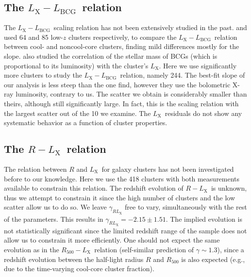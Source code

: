 \documentclass{aa}   %
\newcommand{\LxLbcg}{$L_{\text{X}}-L_{\text{BCG}}$}
\newcommand{\RL}{$R-L_{\text{X}}$}
\newcommand{\Lx}{$L_{\text{X}}$}
\begin{document}
\subsection{The \LxLbcg\ relation}

The \LxLbcg\ scaling relation has not been extensively studied in the past. \citet{mittal2} and \citet{bharad14} used 64 and 85 low-$z$ clusters respectively, to compare the \LxLbcg\ relation between cool- and noncool-core clusters, finding mild differences mostly for the slope. \citet{furnell} also studied the correlation of the stellar mass of BCGs (which is proportional to its luminosity) with the cluster's \Lx. Here we use significantly more clusters to study the \LxLbcg\ relation, namely 244. The best-fit slope of our analysis is less steep than the one \citet{bharad14} find, however they use the bolometric X-ray luminosity, contrary to us. The scatter we obtain is considerably smaller than theirs, although still significantly large. In fact, this is the scaling relation with the largest scatter out of the 10 we examine. The \Lx\ residuals do not show any systematic behavior as a function of cluster properties.

\subsection{The \RL\ relation}\label{R-L-relation}

The relation between $R$ and \Lx\ for galaxy clusters has not been investigated before to our knowledge. Here we use the 418 clusters with both measurements available to constrain this relation. The redshift evolution of \RL\ is unknown, thus we attempt to constrain it since the high number of clusters and the low scatter allow us to do so. We leave $\gamma_{RL_{\text{X}}}$ free to vary, simultaneously with the rest of the parameters. This results in $\gamma_{RL_{\text{X}}}=-2.15\pm 1.51$. The implied evolution is not statistically significant since the limited redshift range of the sample does not allow us to constrain it more efficiently. One should not expect the same evolution as in the $R_{500}-$\Lx\ relation (self-similar prediction of $\gamma\sim 1.3$), since a redshift evolution between the half-light radius $R$ and $R_{500}$ is also expected (e.g., due to the time-varying cool-core cluster fraction). 
\end{document}
